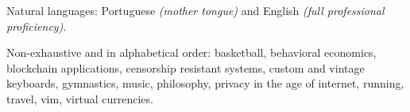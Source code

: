 \documentclass[10pt,a4paper]{article}
\begin{document}
\vspace{0.5em}
\inlineheadsection
  {Natural languages:}
  {Portuguese \emph{(mother tongue)} and English \emph{(full professional proficiency)}.}


\spacedhrule{1.6em}{-0.4em}


\inlineheadsection
  {Non-exhaustive and in alphabetical order:}
  {basketball, behavioral economics, blockchain applications, censorship resistant
systems, custom and vintage keyboards, gymnastics, music, philosophy, privacy in the age of internet, running, travel, vim, virtual currencies.}
\end{document}
